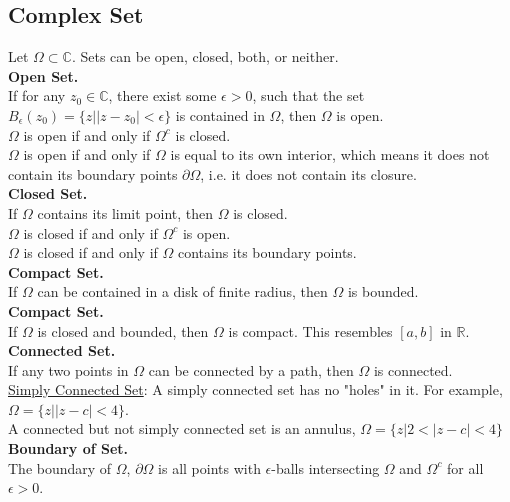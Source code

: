 \documentclass[11pt]{article}
\begin{document}
\subsection{Complex Set} 
Let $\Omega \subset \mathbb{C}$. Sets can be open, closed, both, or neither. \\
\newline
\textbf{Open Set.} \\ 
If for any $z_0 \in \mathbb{C}$, there exist some $\epsilon > 0$, such that the set $B_\epsilon(z_0) = \{z||z - z_0| < \epsilon\}$ is contained in $\Omega$, then $\Omega$ is open. \\
$\Omega$ is open if and only if $\Omega^c$ is closed. \\ 
$\Omega$ is open if and only if $\Omega$ is equal to its own interior, which means it does not contain its boundary points $\partial \Omega$, i.e. it does not contain its closure. \\
\newline
\textbf{Closed Set.} \\ 
If $\Omega$ contains its limit point, then $\Omega$ is closed. \\
$\Omega$ is closed if and only if $\Omega^c$ is open. \\ 
$\Omega$ is closed if and only if $\Omega$ contains its boundary points. \\
\newline
\textbf{Compact Set.}\\ 
If $\Omega$ can be contained in a disk of finite radius, then $\Omega$ is bounded. \\
\newline
\textbf{Compact Set.} \\ 
If $\Omega$ is closed and bounded, then $\Omega$ is compact. This resembles $[a, b]$ in $\mathbb{R}$. \\
\newline
\textbf{Connected Set.}\\ 
If any two points in $\Omega$ can be connected by a path, then $\Omega$ is connected. \\
\underline{Simply Connected Set}: A simply connected set has no "holes" in it. For example, $\Omega = \{z||z - c|<4\}$. \\
A connected but not simply connected set is an annulus, $\Omega = \{z|2< |z - c|<4\}$ \\
\newline
\textbf{Boundary of Set.}\\
The boundary of $\Omega$, $\partial \Omega$ is all points with $\epsilon$-balls intersecting $\Omega$ and $\Omega^c$ for all $\epsilon > 0$. \\
\end{document}
